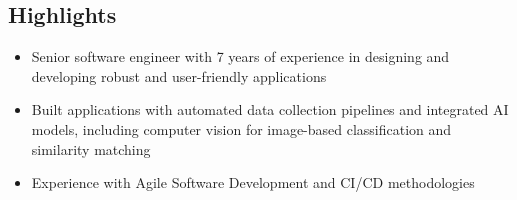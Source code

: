 \documentclass[]{cv}
\begin{document}
\begin{body}
	\section{\vspace{0.05cm} Highlights}
    	\begin{itemize}
            \item {Senior software engineer with 7 years of experience in designing and developing robust and user-friendly applications}
            \item {Built applications with automated data collection pipelines and integrated AI models, including computer vision for image-based classification and similarity matching}
            \item {Experience with Agile Software Development and CI/CD methodologies}
    	\end{itemize}
        \vspace{0.075cm}

\end{body}
\end{document}
